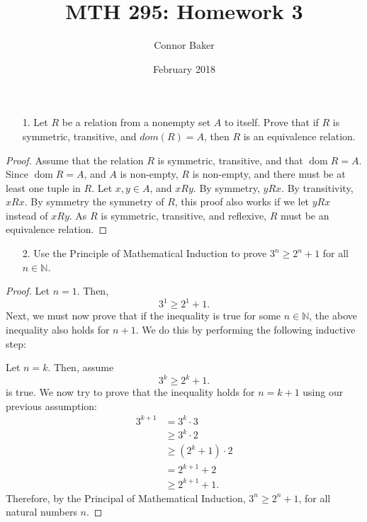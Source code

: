 \documentclass[10pt]{article}
\title{MTH 295: Homework 3}
\author{Connor Baker}
\date{February 2018}
\theoremstyle{definition}
\theoremstyle{plain}
\newcommand{\N}{\mathbb{N}}
\DeclareMathOperator\dom{dom}
\begin{document}
\maketitle

\begin{enumerate}
\item[1.] Let $R$ be a relation from a nonempty set $A$ to itself.  Prove that if $R$ is symmetric, transitive, and $dom(R) = A$, then $R$ is an equivalence relation.
\end{enumerate}

\begin{proof}
    Assume that the relation $R$ is symmetric, transitive, and that $\dom{R}=A.$ Since $\dom{R}=A$, and $A$ is non-empty, $R$ is non-empty, and there must be at least one tuple in $R.$ Let $x,y\in A$, and $xRy$. By symmetry, $yRx$. By transitivity, $xRx$. By symmetry the symmetry of $R$, this proof also works if we let $yRx$ instead of $xRy$. As $R$ is symmetric, transitive, and reflexive, $R$ must be an equivalence relation.
\end{proof}



\pagebreak



\begin{enumerate}
  \item[2.] Use the Principle of Mathematical Induction to prove $3^n \geq 2^n + 1$ for all $n \in \N$.
\end{enumerate}

\begin{proof}
  Let $n=1$. Then,
  \begin{equation}
    3^1 \geq 2^1 + 1.
  \end{equation}
  Next, we must now prove that if the inequality is true for some $n\in\N$, the above inequality also holds for $n+1$. We do this by performing the following inductive step:

  Let $n=k$. Then, assume
  \begin{equation}
    3^k \geq 2^k + 1.
  \end{equation}
  is true. We now try to prove that the inequality holds for $n=k+1$ using our previous assumption:
  \begin{align*}
      3^{k+1} &= 3^k \cdot 3 \\
              &\geq 3^k \cdot 2 \\
              &\geq (2^k+1)\cdot 2 \\
              &= 2^{k+1} +2 \\
              &\geq 2^{k+1} +1.
  \end{align*}
  Therefore, by the Principal of Mathematical Induction, $3^n \geq 2^n + 1$, for all natural numbers $n$.
\end{proof}
\end{document}
